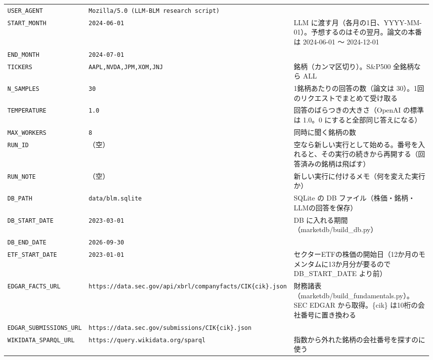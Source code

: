 \documentclass[xelatex,ja=standard,jafont=hiragino-pron,a4paper,10pt]{bxjsreport}
\begin{document}
{\begin{longtable}{p{4.60cm}p{3.60cm}p{6.20cm}}
\texttt{USER\_\allowbreak{}AGENT} & \texttt{Mozilla/\allowbreak{}5.\allowbreak{}0 (LLM-BLM research script)} &  \\
\texttt{START\_\allowbreak{}MONTH} & \texttt{2024-06-01} & LLM に渡す月（各月の1日、YYYY-MM-01）。予想するのはその翌月。論文の本番は 2024-06-01 〜 2024-12-01 \\
\texttt{END\_\allowbreak{}MONTH} & \texttt{2024-07-01} &  \\
\texttt{TICKERS} & \texttt{AAPL,NVDA,JPM,XOM,JNJ} & 銘柄（カンマ区切り）。S\&P500 全銘柄なら ALL \\
\texttt{N\_\allowbreak{}SAMPLES} & \texttt{30} & 1銘柄あたりの回答の数（論文は 30）。1回のリクエストでまとめて受け取る \\
\texttt{TEMPERATURE} & \texttt{1.0} & 回答のばらつきの大きさ（OpenAI の標準は 1.0。0 にすると全部同じ答えになる） \\
\texttt{MAX\_\allowbreak{}WORKERS} & \texttt{8} & 同時に聞く銘柄の数 \\
\texttt{RUN\_\allowbreak{}ID} & （空） & 空なら新しい実行として始める。番号を入れると、その実行の続きから再開する（回答済みの銘柄は飛ばす） \\
\texttt{RUN\_\allowbreak{}NOTE} & （空） & 新しい実行に付けるメモ（何を変えた実行か） \\
\texttt{DB\_\allowbreak{}PATH} & \texttt{data/blm.sqlite} & SQLite の DB ファイル（株価・銘柄・LLMの回答を保存） \\
\texttt{DB\_\allowbreak{}START\_\allowbreak{}DATE} & \texttt{2023-03-01} & DB に入れる期間（marketdb/build\_db.py） \\
\texttt{DB\_\allowbreak{}END\_\allowbreak{}DATE} & \texttt{2026-09-30} &  \\
\texttt{ETF\_\allowbreak{}START\_\allowbreak{}DATE} & \texttt{2023-01-01} & セクターETFの株価の開始日（12か月のモメンタムに13か月分が要るので DB\_START\_DATE より前） \\
\texttt{EDGAR\_\allowbreak{}FACTS\_\allowbreak{}URL} & \texttt{https://\allowbreak{}data.\allowbreak{}sec.\allowbreak{}gov/\allowbreak{}api/\allowbreak{}xbrl/\allowbreak{}companyfacts/\allowbreak{}CIK\{cik\}.\allowbreak{}json} & 財務諸表（marketdb/build\_fundamentals.py）。SEC EDGAR から取得。\{cik\} は10桁の会社番号に置き換わる \\
\texttt{EDGAR\_\allowbreak{}SUBMISSIONS\_\allowbreak{}URL} & \texttt{https://\allowbreak{}data.\allowbreak{}sec.\allowbreak{}gov/\allowbreak{}submissions/\allowbreak{}CIK\{cik\}.\allowbreak{}json} &  \\
\texttt{WIKIDATA\_\allowbreak{}SPARQL\_\allowbreak{}URL} & \texttt{https://\allowbreak{}query.\allowbreak{}wikidata.\allowbreak{}org/\allowbreak{}sparql} & 指数から外れた銘柄の会社番号を探すのに使う \\

\end{longtable}}
\end{document}
